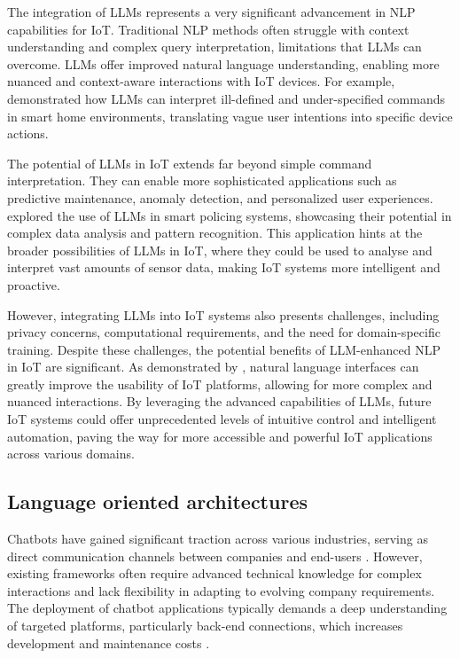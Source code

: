 \documentclass{ieeeaccess}
\begin{document}
The integration of LLMs represents a very significant advancement in NLP capabilities for IoT. Traditional NLP methods often struggle with context understanding and complex query interpretation, limitations that LLMs can overcome. LLMs offer improved natural language understanding, enabling more nuanced and context-aware interactions with IoT devices. For example, \citet{10.1145/3643505} demonstrated how LLMs can interpret ill-defined and under-specified commands in smart home environments, translating vague user intentions into specific device actions.

The potential of LLMs in IoT extends far beyond simple command interpretation. They can enable more sophisticated applications such as predictive maintenance, anomaly detection, and personalized user experiences. \citet{10538107} explored the use of LLMs in smart policing systems, showcasing their potential in complex data analysis and pattern recognition. This application hints at the broader possibilities of LLMs in IoT, where they could be used to analyse and interpret vast amounts of sensor data, making IoT systems more intelligent and proactive.

However, integrating LLMs into IoT systems also presents challenges, including privacy concerns, computational requirements, and the need for domain-specific training. Despite these challenges, the potential benefits of LLM-enhanced NLP in IoT are significant. As demonstrated by \citet{9808139}, natural language interfaces can greatly improve the usability of IoT platforms, allowing for more complex and nuanced interactions. By leveraging the advanced capabilities of LLMs, future IoT systems could offer unprecedented levels of intuitive control and intelligent automation, paving the way for more accessible and powerful IoT applications across various domains.

\subsection{Language oriented architectures}
Chatbots have gained significant traction across various industries, serving as direct communication channels between companies and end-users \cite{8960373}. However, existing frameworks often require advanced technical knowledge for complex interactions and lack flexibility in adapting to evolving company requirements. The deployment of chatbot applications typically demands a deep understanding of targeted platforms, particularly back-end connections, which increases development and maintenance costs \cite{8960373}.
\end{document}
